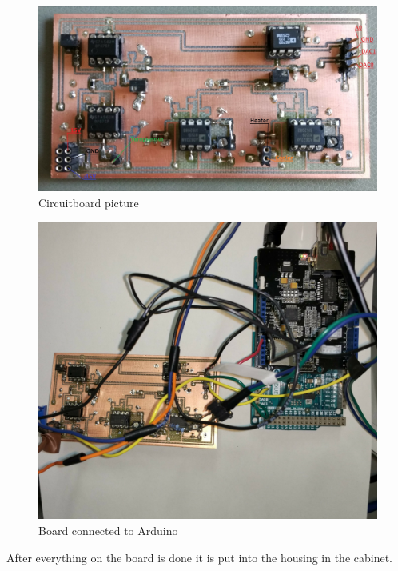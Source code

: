 \documentclass[12pt]{scrartcl}
\begin{document}
      \begin{figure}[H]
        \includegraphics[width = \textwidth]{boardbild.jpg}
        \caption{Circuitboard picture}
        \label{fig5}
      \end{figure}
      \begin{figure}[H]
        \includegraphics[width = \textwidth]{boardwitharduino.jpg}
        \caption{Board connected to Arduino}
        \label{fig6}
      \end{figure}
      After everything on the board is done it is put into the housing in the
      cabinet.
\end{document}
